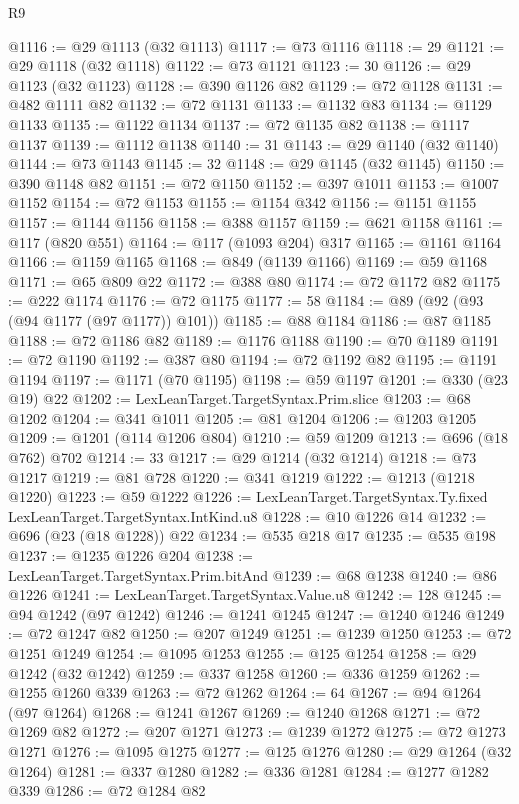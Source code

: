 \begin{lexlean}{R9}
\begin{coremodule}
@1116 := @29 @1113 (@32 @1113)
@1117 := @73 @1116
@1118 := 29
@1121 := @29 @1118 (@32 @1118)
@1122 := @73 @1121
@1123 := 30
@1126 := @29 @1123 (@32 @1123)
@1128 := @390 @1126 @82
@1129 := @72 @1128
@1131 := @482 @1111 @82
@1132 := @72 @1131
@1133 := @1132 @83
@1134 := @1129 @1133
@1135 := @1122 @1134
@1137 := @72 @1135 @82
@1138 := @1117 @1137
@1139 := @1112 @1138
@1140 := 31
@1143 := @29 @1140 (@32 @1140)
@1144 := @73 @1143
@1145 := 32
@1148 := @29 @1145 (@32 @1145)
@1150 := @390 @1148 @82
@1151 := @72 @1150
@1152 := @397 @1011
@1153 := @1007 @1152
@1154 := @72 @1153
@1155 := @1154 @342
@1156 := @1151 @1155
@1157 := @1144 @1156
@1158 := @388 @1157
@1159 := @621 @1158
@1161 := @117 (@820 @551)
@1164 := @117 (@1093 @204) @317
@1165 := @1161 @1164
@1166 := @1159 @1165
@1168 := @849 (@1139 @1166)
@1169 := @59 @1168
@1171 := @65 @809 @22
@1172 := @388 @80
@1174 := @72 @1172 @82
@1175 := @222 @1174
@1176 := @72 @1175
@1177 := 58
@1184 := @89 (@92 (@93 (@94 @1177 (@97 @1177)) @101))
@1185 := @88 @1184
@1186 := @87 @1185
@1188 := @72 @1186 @82
@1189 := @1176 @1188
@1190 := @70 @1189
@1191 := @72 @1190
@1192 := @387 @80
@1194 := @72 @1192 @82
@1195 := @1191 @1194
@1197 := @1171 (@70 @1195)
@1198 := @59 @1197
@1201 := @330 (@23 @19) @22
@1202 := LexLeanTarget.TargetSyntax.Prim.slice
@1203 := @68 @1202
@1204 := @341 @1011
@1205 := @81 @1204
@1206 := @1203 @1205
@1209 := @1201 (@114 @1206 @804)
@1210 := @59 @1209
@1213 := @696 (@18 @762) @702
@1214 := 33
@1217 := @29 @1214 (@32 @1214)
@1218 := @73 @1217
@1219 := @81 @728
@1220 := @341 @1219
@1222 := @1213 (@1218 @1220)
@1223 := @59 @1222
@1226 := LexLeanTarget.TargetSyntax.Ty.fixed LexLeanTarget.TargetSyntax.IntKind.u8
@1228 := @10 @1226 @14
@1232 := @696 (@23 (@18 @1228)) @22
@1234 := @535 @218 @17
@1235 := @535 @198
@1237 := @1235 @1226 @204
@1238 := LexLeanTarget.TargetSyntax.Prim.bitAnd
@1239 := @68 @1238
@1240 := @86 @1226
@1241 := LexLeanTarget.TargetSyntax.Value.u8
@1242 := 128
@1245 := @94 @1242 (@97 @1242)
@1246 := @1241 @1245
@1247 := @1240 @1246
@1249 := @72 @1247 @82
@1250 := @207 @1249
@1251 := @1239 @1250
@1253 := @72 @1251 @1249
@1254 := @1095 @1253
@1255 := @125 @1254
@1258 := @29 @1242 (@32 @1242)
@1259 := @337 @1258
@1260 := @336 @1259
@1262 := @1255 @1260 @339
@1263 := @72 @1262
@1264 := 64
@1267 := @94 @1264 (@97 @1264)
@1268 := @1241 @1267
@1269 := @1240 @1268
@1271 := @72 @1269 @82
@1272 := @207 @1271
@1273 := @1239 @1272
@1275 := @72 @1273 @1271
@1276 := @1095 @1275
@1277 := @125 @1276
@1280 := @29 @1264 (@32 @1264)
@1281 := @337 @1280
@1282 := @336 @1281
@1284 := @1277 @1282 @339
@1286 := @72 @1284 @82

\end{coremodule}
\end{lexlean}
